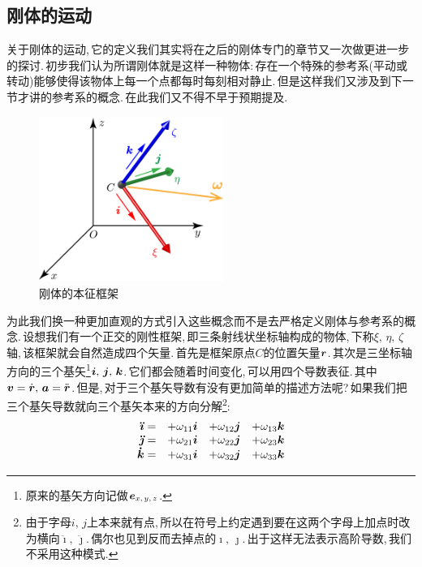 \subsection{刚体的运动}

关于刚体的运动,\,它的定义我们其实将在之后的刚体专门的章节又一次做更进一步的探讨.\,初步我们认为所谓刚体就是这样一种物体:\,存在一个特殊的参考系(平动或转动)能够使得该物体上每一个点都每时每刻相对静止.\,但是这样我们又涉及到下一节才讲的参考系的概念.\,在此我们又不得不早于预期提及.

\begin{figure}\label{6-1-8}
\vspace{-0.2cm}
\centering
\includegraphics[width=6cm]{image/6-1-8.png}
\caption{刚体的本征框架}
\end{figure}
为此我们换一种更加直观的方式引入这些概念而不是去严格定义刚体与参考系的概念.\,设想我们有一个正交的刚性框架,\,即三条射线状坐标轴构成的物体,\,下称$\xi,\,\eta,\,\zeta$轴,\,该框架就会自然造成四个矢量.\,首先是框架原点$C$的位置矢量$\boldsymbol{r}$.\,其次是三坐标轴方向的三个基矢\footnote{原来的基矢方向记做$\boldsymbol{e}_{x,\,y,\,z}$.}$\boldsymbol{i},\,\boldsymbol{j},\,\boldsymbol{k}$.\,它们都会随着时间变化,\,可以用四个导数表征.\,其中$\boldsymbol{v}=\dot{\boldsymbol{r}},\,\boldsymbol{a}=\ddot{\boldsymbol{r}}$.\,但是,\,对于三个基矢导数有没有更加简单的描述方法呢?\,如果我们把三个基矢导数就向三个基矢本来的方向分解\footnote{由于字母$i,\,j$上本来就有点,\,所以在符号上约定遇到要在这两个字母上加点时改为横向$\ddot{\imath},\,\ddot{\jmath}$.\,偶尔也见到反而去掉点的$\imath,\,\jmath$.\,出于这样无法表示高阶导数,\,我们不采用这种模式.}:
\[\begin{array}{rlll}
\boldsymbol{\ddot{\imath}}=		&	+\omega_{11}\boldsymbol{i} 	&	+\omega_{12}\boldsymbol{j} 		& +\omega_{13}\boldsymbol{k}\\
\boldsymbol{\ddot{\jmath}}=		&	+\omega_{21}\boldsymbol{i} 	&	+\omega_{22}\boldsymbol{j} 		& +\omega_{23}\boldsymbol{k}\\
\boldsymbol{\dot{k}}=				&	+\omega_{31}\boldsymbol{i} 	&	+\omega_{32}\boldsymbol{j} 		& +\omega_{33}\boldsymbol{k}
\end{array}\]

